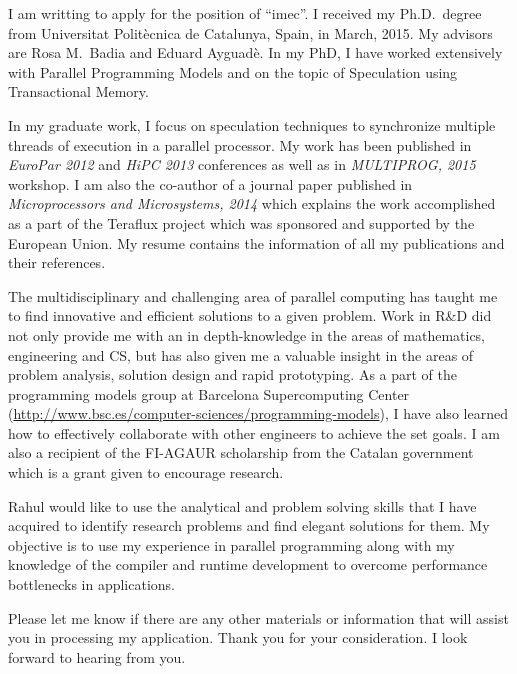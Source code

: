 \documentclass[10pt,stdletter,dateno]{newlfm}
\begin{document}
\begin{newlfm}

I am writting to apply for the position of \enquote{imec}. 
I received my Ph.D.\ degree from Universitat Politècnica de Catalunya, Spain, in March, 2015. My advisors are Rosa M.\ Badia and Eduard Ayguadè. In my PhD, I have worked extensively with Parallel Programming Models and on the topic of Speculation using Transactional Memory. 
%
\par
In my graduate work, I focus on speculation techniques to synchronize multiple threads of execution in a parallel processor. My work has been published in \textit{EuroPar 2012} and \textit{HiPC 2013} conferences as well as in \textit{MULTIPROG, 2015} workshop.  
I am also the co-author of a journal paper published in \textit{Microprocessors and Microsystems, 2014} which explains the work accomplished as a part of the Teraflux project which was sponsored and supported by the European Union. 
My resume contains the information of all my publications and their references. 
%
\par
The multidisciplinary and challenging area of parallel computing has taught me to find innovative and efficient solutions to a given problem. 
Work in R\&D did not only provide me with an in depth-knowledge in the areas of mathematics, engineering and CS, but has also given me a valuable insight in the areas of problem analysis, solution design and rapid prototyping.
As a part of the programming models group at Barcelona Supercomputing Center (\url{http://www.bsc.es/computer-sciences/programming-models}), I have also learned how to effectively collaborate with other engineers to achieve the set goals. 
I am also a recipient of the FI-AGAUR scholarship from the Catalan government which is a grant given to encourage research.  
%
\par
Rahul would like to use the analytical and problem solving skills that I have acquired to identify research problems and find elegant solutions for them. 
My objective is to use my experience in parallel programming along with my knowledge of the compiler and runtime development to overcome performance bottlenecks in applications. 
%
%
\par
Please let me know if there are any other materials or information that will assist you in processing my application. 
Thank you for your consideration. I look forward to hearing from you.


\end{newlfm}
\end{document}

